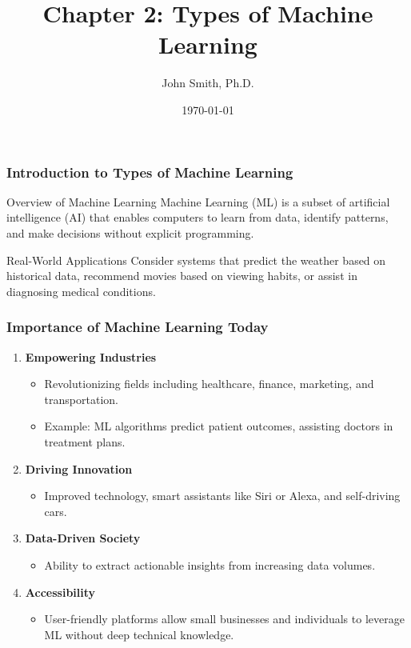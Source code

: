 \documentclass[aspectratio=169]{beamer}
\title[Chapter 2: Types of Machine Learning]{Chapter 2: Types of Machine Learning}
\author[J. Smith]{John Smith, Ph.D.}
\institute[University Name]{
  Department of Computer Science\\
  University Name\\
  Email: email@university.edu\\
  Website: www.university.edu
}
\date{\today}
\begin{document}
\frame{\titlepage}

\begin{frame}[fragile]
    \frametitle{Introduction to Types of Machine Learning}
    \begin{block}{Overview of Machine Learning}
        Machine Learning (ML) is a subset of artificial intelligence (AI) that enables computers to learn from data, identify patterns, and make decisions without explicit programming. 
    \end{block}
    \begin{block}{Real-World Applications}
        Consider systems that predict the weather based on historical data, recommend movies based on viewing habits, or assist in diagnosing medical conditions.
    \end{block}
\end{frame}

\begin{frame}[fragile]
    \frametitle{Importance of Machine Learning Today}
    \begin{enumerate}
        \item \textbf{Empowering Industries}
            \begin{itemize}
                \item Revolutionizing fields including healthcare, finance, marketing, and transportation.
                \item Example: ML algorithms predict patient outcomes, assisting doctors in treatment plans.
            \end{itemize}
        \item \textbf{Driving Innovation}
            \begin{itemize}
                \item Improved technology, smart assistants like Siri or Alexa, and self-driving cars.
            \end{itemize}
        \item \textbf{Data-Driven Society}
            \begin{itemize}
                \item Ability to extract actionable insights from increasing data volumes.
            \end{itemize}
        \item \textbf{Accessibility}
            \begin{itemize}
                \item User-friendly platforms allow small businesses and individuals to leverage ML without deep technical knowledge.
            \end{itemize}
    \end{enumerate}
\end{frame}
\end{document}
